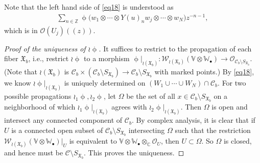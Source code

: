\documentclass[12pt,a4paper,notitlepage]{article}
\theoremstyle{definition}
\theoremstyle{plain}
\newcommand{\fk}{\mathfrak}
\newcommand{\mc}{\mathcal}
\newcommand{\scr}{\mathscr}
\newcommand{\blt}{\bullet}
\newcommand{\Vbb}{\mathbb V}
\newcommand{\Wbb}{\mathbb W}
\newcommand{\Cbb}{\mathbb C}
\newcommand{\Zbb}{\mathbb Z}
\newcommand{\SXb}{{S_{\fk X_b}}}
\numberwithin{equation}{section}
\begin{document}
Note that the left hand side of \eqref{eq18} is understood as
\begin{align*}
\sum_{n\in\Zbb} \upphi\big(w_1\otimes\cdots\otimes Y(u)_nw_j\otimes\cdots\otimes w_N\big)z^{-n-1},
\end{align*}
which is in $\scr O(U_j)((z))$.

\begin{proof}[Proof of the uniqueness of $\wr\upphi$]
It suffices to restrict to the propagation of each fiber $\fk X_b$, i.e., restrict $\wr\upphi$ to a morphism $\upphi|_{\wr(\fk X_b)}:\scr W_{\wr(\fk X_b)}(\Vbb\otimes\Wbb_\blt)\rightarrow\scr O_{\mc C_b\setminus \SXb}$.	(Note that $\wr(\fk X_b)$ is $\mc C_b\times(\mc C_b\setminus\SXb)\rightarrow\mc C_b\setminus\SXb$ with marked points.) By \eqref{eq18}, we know $\wr\upphi|_{\wr(\fk X_b)}$ is uniquely determined on $(W_1\cup\cdots\cup W_N)\cap\mc C_b$. For two possible propagations $\wr_1\upphi,\wr_2\upphi$, let $\Omega$ be the set of all $x\in\mc C_b\setminus\SXb$ on a neighborhood of which $\wr_1\upphi|_{\wr(\fk X_b)}$ agrees with $\wr_2\upphi|_{\wr(\fk X_b)}$. Then $\Omega$ is open and  intersect any connected component of $\mc C_b$. By complex analysis, it is clear that if $U$ is a connected open subset of $\mc C_b\setminus\SXb$ intersecting $\Omega$ such that the restriction $\scr W_{\wr(\fk X_b)}(\Vbb\otimes\Wbb_\blt)|_U$ is equivalent to $\Vbb\otimes\Wbb_\blt\otimes_\Cbb\scr O_U$, then $U\subset\Omega$. So $\Omega$ is closed, and hence must be $\mc C\setminus\SXb$. This proves the uniqueness.
\end{proof}
\end{document}
